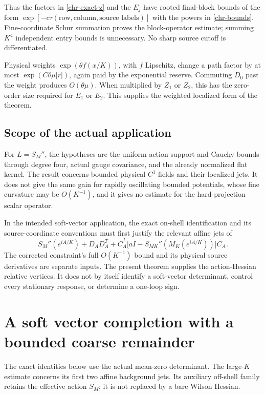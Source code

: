 \documentclass[11pt]{article}
\theoremstyle{remark}
\begin{document}
Thus the factors in \eqref{chr-exact-z} and the \(E_j\) have
rooted final-block bounds of the form
\(\exp[-c\tau(\text{row},\text{column},\text{source labels})]\)
with the powers in \eqref{chr-bounds}.  Fine-coordinate Schur
summation proves the block-operator estimate; summing \(K^4\)
independent entry bounds is unnecessary.  No sharp source cutoff
is differentiated.

Physical weights \(\exp(\theta f(x/K))\), with \(f\) Lipschitz,
change a path factor by at most
\(\exp(C\theta\mu|r|)\), again paid by the exponential reserve.
Commuting \(D_0\) past the weight produces \(O(\theta\mu)\).
When multiplied by \(Z_1\) or \(Z_2\), this has the zero-order
size required for \(E_1\) or \(E_2\).  This supplies the weighted
localized form of the theorem.

\subsection{Scope of the actual application}
\label{chr-scope}

For \(L=S_M''\), the hypotheses are the uniform action support and
Cauchy bounds through degree four, actual gauge covariance, and
the already normalized flat kernel.  The result concerns bounded
physical \(C^1\) fields and their localized jets.  It does not give
the same gain for rapidly oscillating bounded potentials, whose
fine curvature may be \(O(K^{-1})\), and it gives no estimate for
the hard-projection scalar operator.

In the intended soft-vector application, the exact on-shell
identification and its source-coordinate conventions must first
justify the relevant affine jets of
\[
 S_M''(e^{iA/K})+D_AD_A^T+
 \overline C_A^T
 \bigl[aI-S_{MK}''(M_K(e^{iA/K}))\bigr]\overline C_A .
\]
The corrected constraint's full \(O(K^{-1})\) bound and its
physical source derivatives are separate inputs.  The present
theorem supplies the action-Hessian relative vertices.  It does
not by itself identify a soft-vector determinant, control every
stationary response, or determine a one-loop sign.



\section{A soft vector completion with a bounded coarse remainder}
\label{svc-section}

The exact identities below use the actual mean-zero determinant.
The large-$K$ estimate concerns its first two affine background jets.
Its auxiliary off-shell family retains the effective action $S_M$;
it is not replaced by a bare Wilson Hessian.
\end{document}
